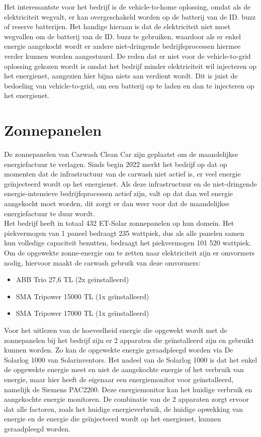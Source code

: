 Het interessantste voor het bedrijf is de vehicle-to-home oplossing, omdat als de elektriciteit wegvalt, er kan overgeschakeld worden op de batterij van de ID. buzz of reserve batterijen. Het handige hieraan is dat de elektriciteit niet moet wegvallen om de batterij van de ID. buzz te gebruiken, waardoor als er enkel energie aangekocht wordt er andere niet-dringende bedrijfsprocessen hiermee verder kunnen worden aangestuurd. De reden dat er niet voor de vehicle-to-grid oplossing gekozen wordt is omdat het bedrijf minder elektriciteit wil injecteren op het energienet, aangezien hier bijna niets aan verdient wordt. Dit is juist de bedoeling van vehicle-to-grid, om een batterij op te laden en dan te injecteren op het energienet.

\section{Zonnepanelen}
\label{sec:stand-van-zaken-zonnepanelen}

De zonnepanelen van Carwash Clean Car zijn geplaatst om de maandelijkse energiefactuur te verlagen. Sinds begin 2022 merkt het bedrijf op dat op momenten dat de infrastructuur van de carwash niet actief is, er veel energie geïnjecteerd wordt op het energienet. Als deze infrastructuur en de niet-dringende energie-intensieve bedrijfsprocessen actief zijn, valt op dat dan wel energie aangekocht moet worden, dit zorgt er dan weer voor dat de maandelijkse energiefactuur te duur wordt.\\

Het bedrijf heeft in totaal 432 ET-Solar zonnepanelen op hun domein. Het piekvermogen van 1 paneel bedraagt 235 wattpiek, dus als alle panelen samen hun volledige capaciteit benutten, bedraagt het piekvermogen 101 520 wattpiek. Om de opgewekte zonne-energie om te zetten naar elektriciteit zijn er omvormers nodig, hiervoor maakt de carwash gebruik van deze omvormers:

\begin{itemize}
    \item ABB Trio 27,6 TL (2x geïnstalleerd)
    \item SMA Tripower 15000 TL (1x geïnstalleerd)
    \item SMA Tripower 17000 TL (1x geïnstalleerd)
\end{itemize}

Voor het uitlezen van de hoeveelheid energie die opgewekt wordt met de zonnepanelen bij het bedrijf zijn er 2 apparaten die geïnstalleerd zijn en gebruikt kunnen worden. Zo kan de opgewekte energie geraadpleegd worden via De Solarlog 1000 van Solarinventors. Het nadeel van de Solarlog 1000 is dat het enkel de opgewekte energie meet en niet de aangekochte energie of het verbruik van energie, maar hier heeft de eigenaar een energiemonitor voor geïnstalleerd, namelijk de Siemens PAC2200. Deze energiemonitor kan het huidige verbruik en aangekochte energie monitoren. De combinatie van de 2 apparaten zorgt ervoor dat alle factoren, zoals het huidige energieverbruik, de huidige opwekking van energie en de energie die geïnjecteerd wordt op het energienet, kunnen geraadpleegd worden.\\

